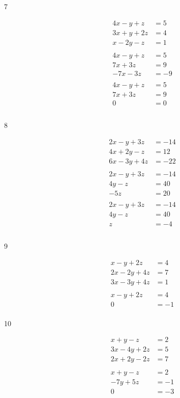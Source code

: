 \documentclass[fleqn,addpoints]{exam}
\begin{document}
\begin{description}

\item[7]
\begin{align*}
  4x-y+z &= 5 \\
  3x+y+2z &= 4 \\
  x-2y-z &= 1 \\
\\
  4x-y+z &= 5 \\
  7x + 3z &= 9 \\
  -7x - 3z &= -9 \\
\\
  4x-y+z &= 5 \\
  7x + 3z &= 9 \\
  0 &= 0 \\
\\
\end{align*}



\item[8]
\begin{align*}
  2x - y + 3z &= -14 \\
  4x + 2y - z &= 12 \\
  6x - 3y + 4z &= -22 \\
\\
  2x - y + 3z &= -14 \\
  4y - z &= 40 \\
  -5z &= 20 \\
\\
  2x - y + 3z &= -14 \\
  4y - z &= 40 \\
  z &= -4 \\
\\
\end{align*}


\item[9]
\begin{align*}
  x-y+2z &= 4 \\
  2x-2y+4z &= 7 \\
  3x - 3y + 4z &= 1 \\
\\
  x - y + 2z &= 4 \\
  0 &= -1 \\
\end{align*}


\item[10]
\begin{align*}
  x + y - z &= 2 \\
  3x - 4y + 2z &= 5 \\
  2x + 2y - 2z &= 7 \\
\\
  x + y - z &= 2 \\
  -7y + 5z &= -1 \\
  0 &= -3 \\
\end{align*}


\end{description}
\end{document}

